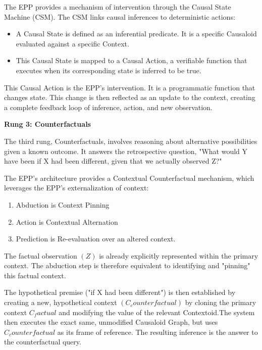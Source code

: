 The EPP provides a mechanism of intervention through the Causal State Machine (CSM). 
The CSM  links causal inferences to deterministic actions:

\begin{itemize}
	\item A Causal State is defined as an inferential predicate. It is a specific Causaloid evaluated against a specific Context.
	\item This Causal State is mapped to a Causal Action, a verifiable function that executes when its corresponding state is inferred to be true.

\end{itemize}

This Causal Action is the EPP's intervention. It is a programmatic function that changes state. 
This change is then reflected as an update to the context, creating a complete feedback loop of inference, action, and new observation.

\textbf{Rung 3: Counterfactuals}

The third rung, Counterfactuals, involves reasoning about alternative possibilities given a known outcome. It answers the retrospective question, "What would Y have been if X had been different, given that we actually observed Z?"

The EPP's architecture provides a Contextual Counterfactual mechanism, which leverages the EPP's externalization of context:

\begin{enumerate}
	\item Abduction is Context Pinning
	\item Action is Contextual Alternation
	\item Prediction is Re-evaluation over an altered context. 
\end{enumerate}

The factual observation $(Z)$ is already explicitly represented within the primary context. 
The abduction step is therefore equivalent to identifying and "pinning" this factual context.

The hypothetical premise ("if X had been different") is then established by creating a new, hypothetical context $(C_counterfactual)$ by cloning the primary context $C_factual$ and modifying the value of the relevant Contextoid.The system then executes the exact same, unmodified Causaloid Graph, but uses $C_counterfactual$ as its frame of reference. The resulting inference is the answer to the counterfactual query. 


